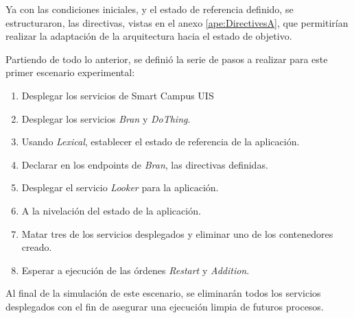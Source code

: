 Ya con las condiciones iniciales, y el estado de referencia definido, se estructuraron, las directivas, vistas en el anexo \ref{ape:DirectivesA}, que permitirían realizar la adaptación de la arquitectura hacia el estado de objetivo. 

Partiendo de todo lo anterior, se definió la serie de pasos a realizar para este primer escenario experimental:

\begin{enumerate}[itemsep=0mm]
    \item Desplegar los servicios de Smart Campus UIS
    \item Desplegar los servicios \textit{Bran} y \textit{DoThing}.
    \item Usando \textit{Lexical}, establecer el estado de referencia de la aplicación.
    \item Declarar en los endpoints de \textit{Bran}, las directivas definidas.
    \item Desplegar el servicio \textit{Looker} para la aplicación.
    \item A la nivelación del estado de la aplicación.
    \item Matar tres de los servicios desplegados y eliminar uno de los contenedores creado.
    \item Esperar a ejecución de las órdenes \textit{Restart} y \textit{Addition}.
\end{enumerate}

Al final de la simulación de este escenario, se eliminarán todos los servicios desplegados con el fin de asegurar una ejecución limpia de futuros procesos.
